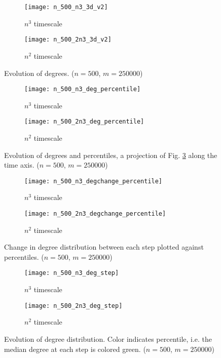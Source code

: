\centering
\begin{figure}[h!]
  \vspace{-30mm}
  \begin{subfigure}{0.5\textwidth}
    \texttt{[image: n\_500\_n3\_3d\_v2]}
    \caption{$n^{3}$ timescale}
    \label{fig:100s3}
  \end{subfigure}%
  \begin{subfigure}{0.5\textwidth}
    \texttt{[image: n\_500\_2n3\_3d\_v2]}
    \caption{$n^{2}$ timescale}
    \label{fig:100s3}
  \end{subfigure}%
  \caption{Evolution of degrees. ($n=500$, $m=250000$)}
  \label{fig:n500_3d}
\end{figure}

\begin{figure}[h!]
  \vspace{-5mm}
  \centering
  \begin{subfigure}{0.5\textwidth}
    \centering
    \texttt{[image: n\_500\_n3\_deg\_percentile]}
    \caption{$n^{3}$ timescale}
    \label{fig:100s3}
  \end{subfigure}%
  \begin{subfigure}{0.5\textwidth}
    \centering
    \texttt{[image: n\_500\_2n3\_deg\_percentile]}
    \caption{$n^{2}$ timescale}
    \label{fig:100s3}
  \end{subfigure}%
  \caption{Evolution of degrees and percentiles, a projection of Fig. \ref{fig:n500_3d} along the time axis. ($n=500$, $m=250000$)}
\end{figure}

\begin{figure}[h!]
  \vspace{-5mm}
  \centering
  \begin{subfigure}{0.5\textwidth}
    \centering
    \texttt{[image: n\_500\_n3\_degchange\_percentile]}
    \caption{$n^{3}$ timescale}
    \label{fig:100s3}
  \end{subfigure}%
  \begin{subfigure}{0.5\textwidth}
    \centering
    \texttt{[image: n\_500\_2n3\_degchange\_percentile]}
    \caption{$n^{2}$ timescale}
    \label{fig:100s3}
  \end{subfigure}%
  \caption{Change in degree distribution between each step plotted against percentiles. ($n=500$, $m=250000$)}
\end{figure}

\begin{figure}[h!]
  \vspace{-5mm}
  \begin{subfigure}{0.5\textwidth}
    \texttt{[image: n\_500\_n3\_deg\_step]}
    \caption{$n^{3}$ timescale}
    \label{fig:100s3}
  \end{subfigure}%
  \begin{subfigure}{0.5\textwidth}
    \texttt{[image: n\_500\_2n3\_deg\_step]}
    \caption{$n^{2}$ timescale}
    \label{fig:100s3}
  \end{subfigure}%
  \caption{Evolution of degree distribution. Color indicates percentile, i.e. the median degree at each step is colored green. ($n=500$, $m=250000$)}
\end{figure}

